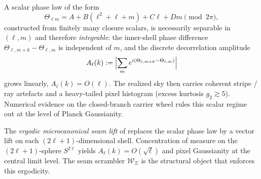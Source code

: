\begin{remark}
\label{rem:ergodic-vs-scalar}
A scalar phase law of the form
\[
\Theta_{\ell m}=A+B(\ell^2+\ell+m)+C\ell+Dm\pmod{2\pi},
\]
constructed from finitely many closure scalars, is necessarily separable in $(\ell,m)$ and
therefore \emph{integrable}: the inner-shell phase difference
$\Theta_{\ell,m+k}-\Theta_{\ell,m}$ is independent of $m$, and the discrete decorrelation
amplitude
\[
A_\ell(k):=\Bigl|\sum_{m}e^{i(\Theta_{\ell,m+k}-\Theta_{\ell,m})}\Bigr|
\]
grows linearly, $A_\ell(k)=O(\ell)$. The realized sky then carries coherent stripe / ray
artefacts and a heavy-tailed pixel histogram (excess kurtosis $g_2\gtrsim 5$). Numerical evidence
on the closed-branch carrier wheel rules this scalar regime out at the level of Planck Gaussianity.

The \emph{ergodic microcanonical seam lift} of  replaces the
scalar phase law by a vector lift on each $(2\ell+1)$-dimensional shell. Concentration of measure
on the $(2\ell+1)$-sphere $S^{2\ell}$ yields $A_\ell(k)=O(\sqrt{\ell})$ and pixel Gaussianity at the
central limit level. The seam scrambler $\mathcal W_\Sigma$ is the structural object that
enforces this ergodicity.
\end{remark}

